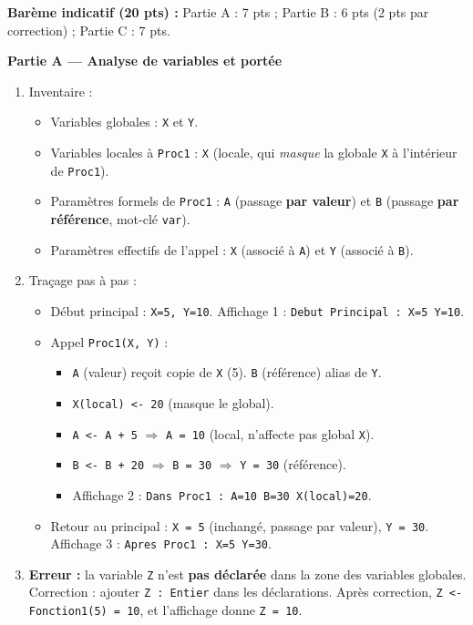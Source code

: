 \documentclass[11pt]{article}
\begin{document}
\begin{corrige}
\textbf{Barème indicatif (20 pts) :} Partie A : 7 pts ; Partie B : 6 pts (2 pts par correction) ; Partie C : 7 pts.

\textbf{Partie A — Analyse de variables et portée}
\begin{enumerate}
    \item Inventaire :
    \begin{itemize}
        \item Variables globales : \texttt{X} et \texttt{Y}.
        \item Variables locales à \texttt{Proc1} : \texttt{X} (locale, qui \emph{masque} la globale \texttt{X} à l'intérieur de \texttt{Proc1}).
        \item Paramètres formels de \texttt{Proc1} : \texttt{A} (passage \textbf{par valeur}) et \texttt{B} (passage \textbf{par référence}, mot-clé \texttt{var}).
        \item Paramètres effectifs de l'appel : \texttt{X} (associé à \texttt{A}) et \texttt{Y} (associé à \texttt{B}).
    \end{itemize}
    \item Traçage pas à pas :
    \begin{itemize}
        \item Début principal : \texttt{X=5, Y=10}. Affichage 1 : \texttt{Debut Principal : X=5 Y=10}.
        \item Appel \texttt{Proc1(X, Y)} :
              \begin{itemize}
                  \item \texttt{A} (valeur) reçoit copie de \texttt{X} (5). \texttt{B} (référence) alias de \texttt{Y}.
                  \item \texttt{X(local) <- 20} (masque le global).
                  \item \texttt{A <- A + 5} $\Rightarrow$ \texttt{A = 10} (local, n'affecte pas global \texttt{X}).
                  \item \texttt{B <- B + 20} $\Rightarrow$ \texttt{B = 30} $\Rightarrow$ \texttt{Y = 30} (référence).
                  \item Affichage 2 : \texttt{Dans Proc1 : A=10 B=30 X(local)=20}.
              \end{itemize}
        \item Retour au principal : \texttt{X = 5} (inchangé, passage par valeur), \texttt{Y = 30}. Affichage 3 : \texttt{Apres Proc1 : X=5 Y=30}.
    \end{itemize}
    \item \textbf{Erreur :} la variable \texttt{Z} n'est \textbf{pas déclarée} dans la zone des variables globales. Correction : ajouter \texttt{Z : Entier} dans les déclarations. Après correction, \texttt{Z <- Fonction1(5) = 10}, et l'affichage donne \texttt{Z = 10}.
\end{enumerate}


\end{corrige}
\end{document}

